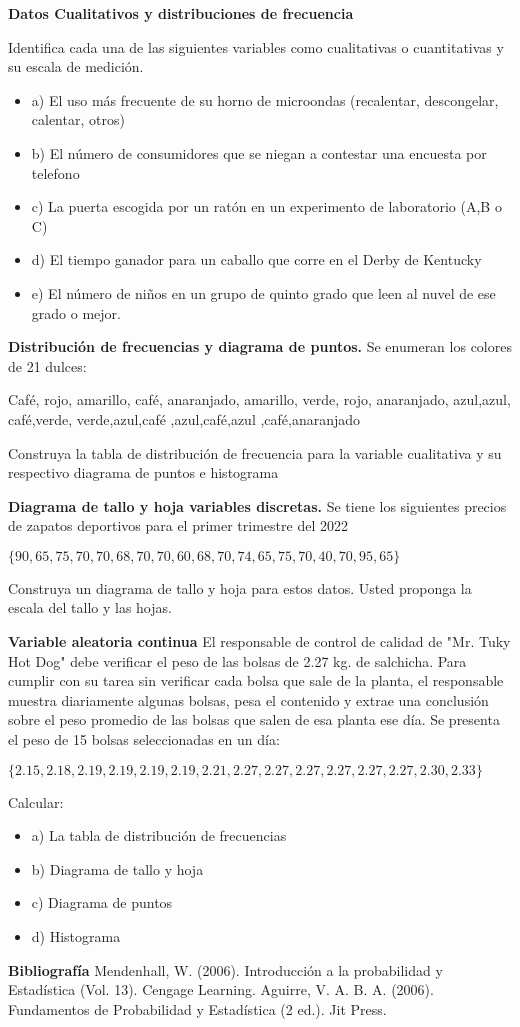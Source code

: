 \documentclass{oxmathproblems}
\begin{document}
\begin{questions}

\miquestion \textbf{Datos Cualitativos y distribuciones de frecuencia}

Identifica cada una de las siguientes variables como cualitativas o cuantitativas y su escala de medición. 
\begin{itemize}
\item a) El uso más frecuente de su horno de microondas (recalentar, descongelar, calentar, otros)

\item b) El número de consumidores que se niegan a contestar una encuesta por telefono 

\item c) La puerta escogida por un ratón en un experimento de laboratorio (A,B o C)

\item d) El tiempo ganador para un caballo que corre en el Derby de Kentucky 

\item e) El número de niños en un grupo de quinto grado que leen al nuvel de ese grado o mejor. 
\end{itemize}

\miquestion \textbf{Distribución de frecuencias y diagrama de puntos.}
Se enumeran los colores de 21 dulces: 

{Café,
rojo,
amarillo,
café,
anaranjado,
amarillo,
verde,
rojo,
anaranjado,
azul,azul,
café,verde,
verde,azul,café
,azul,café,azul
,café,anaranjado}


Construya la tabla de distribución de frecuencia para la variable cualitativa y su respectivo diagrama de puntos e histograma

\miquestion \textbf{Diagrama de tallo y hoja variables discretas.}
Se tiene los siguientes precios de zapatos deportivos para el primer trimestre del 2022

$\{90,65,75,70,70,68,70,70,60,68,70,74,65,75,70,40,70,95,65\}$

Construya un diagrama de tallo y hoja para estos datos. Usted proponga la escala del tallo y las hojas.

\miquestion \textbf{Variable aleatoria continua}
El responsable de control de calidad de "Mr. Tuky Hot Dog" debe verificar el peso de las bolsas de 2.27 kg. de salchicha. Para cumplir con su tarea sin verificar cada bolsa que sale de la planta, el responsable muestra diariamente algunas bolsas, pesa el contenido y extrae una conclusión sobre el peso promedio de las bolsas que salen de esa planta ese día. 
Se presenta el peso de 15 bolsas seleccionadas en un día: 

$\{2.15,2.18,2.19,2.19,2.19,2.19,2.21,2.27,2.27,2.27,2.27,2.27,2.27,2.30,2.33\}$

Calcular: 
\begin{itemize}
\item a) La tabla de distribución de frecuencias
\item b) Diagrama de tallo y hoja
\item c) Diagrama de puntos 
\item d) Histograma 
\end{itemize}

\end{questions}
\textbf{Bibliografía}
Mendenhall, W. (2006). Introducción a la probabilidad y Estadística (Vol. 13). Cengage Learning.
Aguirre, V. A. B. A. (2006). Fundamentos de Probabilidad y Estadística (2 ed.). Jit Press.
\end{document}
